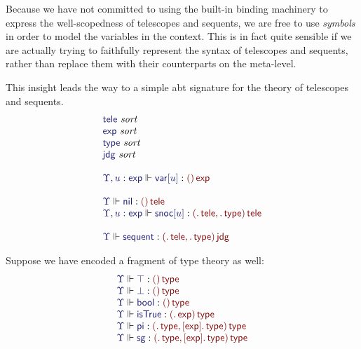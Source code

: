 \documentclass[11pt]{article}
\theoremstyle{definition}
\theoremstyle{remark}
\numberwithin{equation}{section}
\def\IModeColorName{MidnightBlue}
\def\OModeColorName{Maroon}
\newcommand\IMode[1]{{\color{\IModeColorName}{#1}}}
\newcommand\OMode[1]{{\color{\OModeColorName}{#1}}}
\newcommand\MkValence[3]{%
  \ifthenelse{\equal{#1}{}}{}{%
    \{#1\}%
  }%
  \ifthenelse{\equal{#2}{}}{}{%
    [#2]%
  }.\, #3
}
\newcommand\MkArity[2]{(#1)\, #2}
\newcommand\IsSort[1]{\IMode{#1}\ \textit{sort}}
\newcommand\IsOperator[3]{\IMode{#1}\Vdash \IMode{#2} : \OMode{#3}}
\newcommand\SortExp{\mathsf{exp}}
\begin{document}
Because we have not committed to using the built-in binding machinery to
express the well-scopedness of telescopes and sequents, we are free to use
\emph{symbols} in order to model the variables in the context. This is in fact
quite sensible if we are actually trying to faithfully represent the syntax of
telescopes and sequents, rather than replace them with their counterparts on
the meta-level.

This insight leads the way to a simple abt signature for the theory of telescopes
and sequents.
%
\newcommand\SortTele{\mathsf{tele}}
\newcommand\SortJdg{\mathsf{jdg}}
\newcommand\SortType{\mathsf{type}}
\newcommand\SortExpr{\mathsf{exp}}
\newcommand\OpNil{\mathsf{nil}}
\newcommand\OpSnoc[1]{\mathsf{snoc}[#1]}
\newcommand\OpVar[1]{\mathsf{var}[#1]}
\newcommand\OpSequent{\mathsf{sequent}}
%
\[
  \begin{array}{l}
    \IsSort{\SortTele}\\
    \IsSort{\SortExpr}\\
    \IsSort{\SortType}\\
    \IsSort{\SortJdg}\\\\
    \IsOperator{\Upsilon, u:\SortExpr}{\OpVar{u}}{
      \MkArity{}{\SortExpr}
    }\\\\
    \IsOperator{\Upsilon}{\OpNil}{
      \MkArity{}{\SortTele}
    }\\
    \IsOperator{\Upsilon, u:\SortExpr}{\OpSnoc{u}}{
      \MkArity{
        \MkValence{}{}{\SortTele},
        \MkValence{}{}{\SortType}
      }{\SortTele}
    }\\\\
    \IsOperator{\Upsilon}{\OpSequent}{
      \MkArity{
        \MkValence{}{}{\SortTele},
        \MkValence{}{}{\SortType}
      }{\SortJdg}
    }
  \end{array}
\]

\newcommand\OpPi{\mathsf{pi}}
\newcommand\OpSg{\mathsf{sg}}
\newcommand\OpBool{\mathsf{bool}}
\newcommand\OpSo{\mathsf{isTrue}}

Suppose we have encoded a fragment of type theory as well:
\[
  \begin{array}{l}
    \IsOperator{\Upsilon}{\top}{
      \MkArity{}{\SortType}
    }\\
    \IsOperator{\Upsilon}{\bot}{
      \MkArity{}{\SortType}
    }\\
    \IsOperator{\Upsilon}{\OpBool}{
      \MkArity{}{\SortType}
    }\\
    \IsOperator{\Upsilon}{\OpSo}{
      \MkArity{
        \MkValence{}{}{\SortExp}
      }{\SortType}
    }\\
    \IsOperator{\Upsilon}{\OpPi}{
      \MkArity{
        \MkValence{}{}{\SortType},
        \MkValence{}{\SortExp}{\SortType}
      }{\SortType}
    }\\
    \IsOperator{\Upsilon}{\OpSg}{
      \MkArity{
        \MkValence{}{}{\SortType},
        \MkValence{}{\SortExp}{\SortType}
      }{\SortType}
    }\\
  \end{array}
\]
\end{document}
